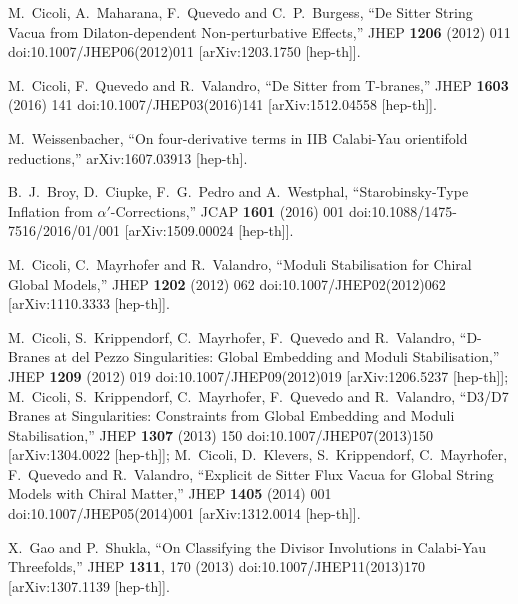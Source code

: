 \documentclass[11pt,a4paper]{article}
\begin{document}
\begin{thebibliography}{99}
  M.~Cicoli, A.~Maharana, F.~Quevedo and C.~P.~Burgess,
  ``De Sitter String Vacua from Dilaton-dependent Non-perturbative Effects,''
  JHEP {\bf 1206} (2012) 011
  doi:10.1007/JHEP06(2012)011
  [arXiv:1203.1750 [hep-th]].

  M.~Cicoli, F.~Quevedo and R.~Valandro,
  ``De Sitter from T-branes,''
  JHEP {\bf 1603} (2016) 141
  doi:10.1007/JHEP03(2016)141
  [arXiv:1512.04558 [hep-th]].

  M.~Weissenbacher,
  ``On four-derivative terms in IIB Calabi-Yau orientifold reductions,''
  arXiv:1607.03913 [hep-th].

  B.~J.~Broy, D.~Ciupke, F.~G.~Pedro and A.~Westphal,
  ``Starobinsky-Type Inflation from $\alpha'$-Corrections,''
  JCAP {\bf 1601} (2016) 001
  doi:10.1088/1475-7516/2016/01/001
  [arXiv:1509.00024 [hep-th]].

  M.~Cicoli, C.~Mayrhofer and R.~Valandro,
  ``Moduli Stabilisation for Chiral Global Models,''
  JHEP {\bf 1202} (2012) 062
  doi:10.1007/JHEP02(2012)062
  [arXiv:1110.3333 [hep-th]].

M.~Cicoli, S.~Krippendorf, C.~Mayrhofer, F.~Quevedo and R.~Valandro,
  ``D-Branes at del Pezzo Singularities: Global Embedding and Moduli Stabilisation,''
  JHEP {\bf 1209} (2012) 019
  doi:10.1007/JHEP09(2012)019
  [arXiv:1206.5237 [hep-th]];
	M.~Cicoli, S.~Krippendorf, C.~Mayrhofer, F.~Quevedo and R.~Valandro,
  ``D3/D7 Branes at Singularities: Constraints from Global Embedding and Moduli Stabilisation,''
  JHEP {\bf 1307} (2013) 150
  doi:10.1007/JHEP07(2013)150
  [arXiv:1304.0022 [hep-th]];
M.~Cicoli, D.~Klevers, S.~Krippendorf, C.~Mayrhofer, F.~Quevedo and R.~Valandro,
  ``Explicit de Sitter Flux Vacua for Global String Models with Chiral Matter,''
  JHEP {\bf 1405} (2014) 001
  doi:10.1007/JHEP05(2014)001
  [arXiv:1312.0014 [hep-th]].

  X.~Gao and P.~Shukla,
  ``On Classifying the Divisor Involutions in Calabi-Yau Threefolds,''
  JHEP {\bf 1311}, 170 (2013)
  doi:10.1007/JHEP11(2013)170
  [arXiv:1307.1139 [hep-th]].


\end{thebibliography}
\end{document}
